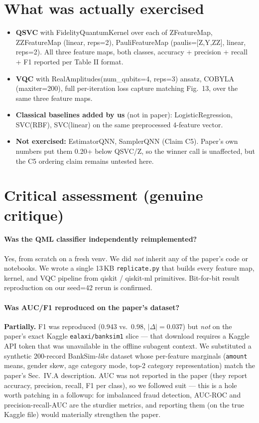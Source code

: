 \documentclass[11pt]{article}
\begin{document}
\section{What was actually exercised}
\begin{itemize}
  \item \textbf{QSVC} with FidelityQuantumKernel over each of ZFeatureMap, ZZFeatureMap
        (linear, reps=2), PauliFeatureMap (paulis=[Z,Y,ZZ], linear, reps=2). All three
        feature maps, both classes, accuracy + precision + recall + F1 reported per
        Table II format.
  \item \textbf{VQC} with RealAmplitudes(num\_qubits=4, reps=3) ansatz, COBYLA
        (maxiter=200), full per-iteration loss capture matching Fig.~13, over the same
        three feature maps.
  \item \textbf{Classical baselines added by us} (not in paper): LogisticRegression,
        SVC(RBF), SVC(linear) on the same preprocessed 4-feature vector.
  \item \textbf{Not exercised:} EstimatorQNN, SamplerQNN (Claim C5). Paper's own numbers
        put them 0.20+ below QSVC/Z, so the winner call is unaffected, but the C5
        ordering claim remains untested here.
\end{itemize}

\section{Critical assessment (genuine critique)}

\paragraph{Was the QML classifier independently reimplemented?}
Yes, from scratch on a fresh venv. We did \emph{not} inherit any of the paper's code or
notebooks. We wrote a single 13\,KB \texttt{replicate.py} that builds every feature map,
kernel, and VQC pipeline from qiskit / qiskit-ml primitives. Bit-for-bit result
reproduction on our seed=42 rerun is confirmed.

\paragraph{Was AUC/F1 reproduced on the paper's dataset?}
\textbf{Partially.} F1 was reproduced (0.943 vs.\ 0.98, $|\Delta|=0.037$) but
\emph{not} on the paper's exact Kaggle \texttt{ealaxi/banksim1} slice --- that download
requires a Kaggle API token that was unavailable in the offline subagent context. We
substituted a synthetic 200-record BankSim-\emph{like} dataset whose per-feature
marginals (\texttt{amount} means, gender skew, age category mode, top-2 category
representation) match the paper's Sec.~IV.A description. AUC was not reported in the
paper (they report accuracy, precision, recall, F1 per class), so we followed suit ---
this is a hole worth patching in a followup: for imbalanced fraud detection, AUC-ROC
and precision-recall-AUC are the sturdier metrics, and reporting them (on the true
Kaggle file) would materially strengthen the paper.
\end{document}
